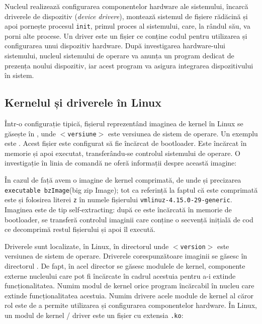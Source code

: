 Nucleul realizează configurarea componentelor hardware ale sistemului, încarcă driverele de dispozitiv (\textit{device drivere}), montează sistemul de fișiere rădăcină și apoi pornește procesul \texttt{init}, primul proces al sistemului, care, la rândul său, va porni alte procese.
Un driver este un fișier ce conține codul pentru utilizarea și configurarea unui dispozitiv hardware.
După investigarea hardware-ului sistemului, nucleul sistemului de operare va anunța un program dedicat de prezența noului dispozitiv, iar acest program va asigura integrarea dispozitivului în sistem.

\subsection{Kernelul și driverele în Linux}
\label{sec:boot:os-linux}

Într-o configurație tipică, fișierul reprezentând imaginea de kernel în Linux se găsește în , unde \texttt{$<$versiune$>$} este versiunea de sistem de operare.
Un exemplu este .
Acest fișier este configurat să fie încărcat de bootloader.
Este încărcat în memorie și apoi executat, transferându-se controlul sistemului de operare.
O investigație în linia de comandă ne oferă informații despre această imagine:


În cazul de față avem o imagine de kernel comprimată, de unde și precizarea \texttt{executable bzImage}(big zip Image);
tot ca referință la faptul că este comprimată este și folosirea literei \texttt{z} în numele fișierului \texttt{vmlinuz-4.15.0-29-generic}.
Imaginea este de tip self-extracting: după ce este încărcată în memorie de bootloader, se transferă controlul imaginii care conține o secvență inițială de cod ce decomprimă restul fișierului și apoi îl execută.

Driverele sunt localizate, în Linux, în directorul  unde \texttt{$<$version$>$} este versiunea de sistem de operare.
Driverele corespunzătoare imaginii  se găsesc în directorul .
De fapt, în acel director se găsesc modulele de kernel, componente externe nucleului care pot fi încărcate în cadrul acestuia pentru a-i extinde funcționalitatea.
Numim modul de kernel orice program încărcabil în nucleu care extinde funcționalitatea acestuia.
Numim drivere acele module de kernel al căror rol este de a permite utilizarea și configurarea componentelor hardware.
 În Linux, un modul de kernel / driver este un fișier cu extensia \texttt{.ko}:

